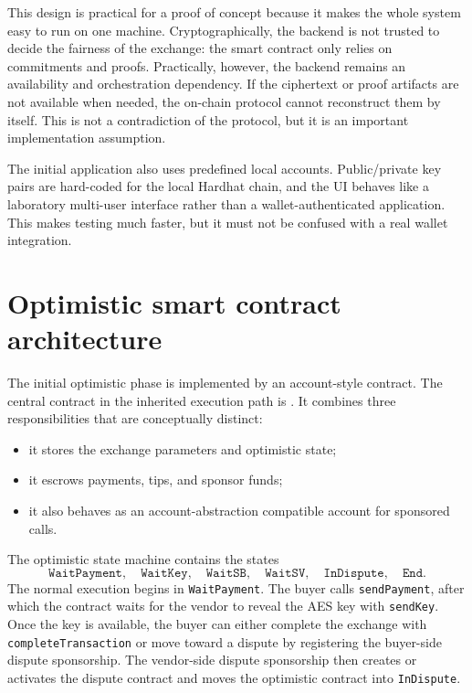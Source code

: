This design is practical for a proof of concept because it makes the whole system easy to
run on one machine. Cryptographically, the backend is not trusted to decide the fairness of
the exchange: the smart contract only relies on commitments and proofs. Practically, however,
the backend remains an availability and orchestration dependency. If the ciphertext or proof
artifacts are not available when needed, the on-chain protocol cannot reconstruct them by
itself. This is not a contradiction of the protocol, but it is an important implementation
assumption.

The initial application also uses predefined local accounts. Public/private key pairs are
hard-coded for the local Hardhat chain, and the UI behaves like a laboratory multi-user
interface rather than a wallet-authenticated application. This makes testing much faster, but
it must not be confused with a real wallet integration.

\section{Optimistic smart contract architecture}

The initial optimistic phase is implemented by an account-style contract. The central
contract in the inherited execution path is . It combines
three responsibilities that are conceptually distinct:

\begin{itemize}
  \item it stores the exchange parameters and optimistic state;
  \item it escrows payments, tips, and sponsor funds;
  \item it also behaves as an account-abstraction compatible account for sponsored calls.
\end{itemize}

The optimistic state machine contains the states
\[
  \texttt{WaitPayment},\quad
  \texttt{WaitKey},\quad
  \texttt{WaitSB},\quad
  \texttt{WaitSV},\quad
  \texttt{InDispute},\quad
  \texttt{End}.
\]
The normal execution begins in \texttt{WaitPayment}. The buyer calls
\texttt{sendPayment}, after which the contract waits for the vendor to reveal the AES key
with \texttt{sendKey}. Once the key is available, the buyer can either complete the exchange
with \texttt{completeTransaction} or move toward a dispute by registering the buyer-side
dispute sponsorship. The vendor-side dispute sponsorship then creates or activates the
dispute contract and moves the optimistic contract into \texttt{InDispute}.


